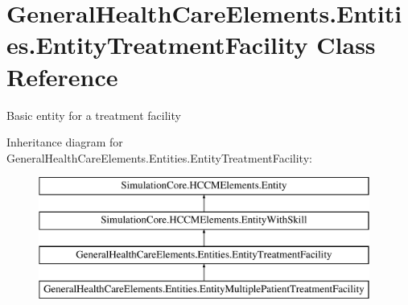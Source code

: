 \hypertarget{class_general_health_care_elements_1_1_entities_1_1_entity_treatment_facility}{}\section{General\+Health\+Care\+Elements.\+Entities.\+Entity\+Treatment\+Facility Class Reference}
\label{class_general_health_care_elements_1_1_entities_1_1_entity_treatment_facility}


Basic entity for a treatment facility  


Inheritance diagram for General\+Health\+Care\+Elements.\+Entities.\+Entity\+Treatment\+Facility\+:\begin{figure}[H]
\begin{center}
\leavevmode
\includegraphics[height=4.000000cm]{class_general_health_care_elements_1_1_entities_1_1_entity_treatment_facility}
\end{center}
\end{figure}
